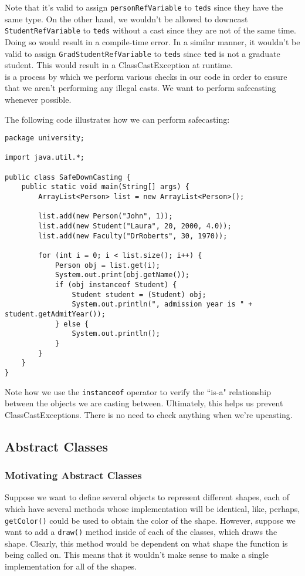 Note that it's valid to assign \verb!personRefVariable! to \verb!teds! since they have the same type. On the other hand, we wouldn't be allowed to downcast \verb!StudentRefVariable! to \verb!teds! without a cast since they are not of the same time. Doing so would result in a compile-time error. In a similar manner, it wouldn't be valid to assign \verb!GradStudentRefVariable! to \verb!teds! since \verb!ted! is not a graduate student. This would result in a ClassCastException at runtime. \\

 is a process by which we perform various checks in our code in order to ensure that we aren't performing any illegal casts. We want to perform safecasting whenever possible.

The following code illustrates how we can perform safecasting:

\begin{lstlisting}
package university;

import java.util.*;

public class SafeDownCasting {
	public static void main(String[] args) {
		ArrayList<Person> list = new ArrayList<Person>();

		list.add(new Person("John", 1));
		list.add(new Student("Laura", 20, 2000, 4.0));
		list.add(new Faculty("DrRoberts", 30, 1970));

		for (int i = 0; i < list.size(); i++) {
			Person obj = list.get(i);
			System.out.print(obj.getName());
			if (obj instanceof Student) {
				Student student = (Student) obj;
				System.out.println(", admission year is " + student.getAdmitYear());
			} else {
				System.out.println();
			}
		}
	}
}
\end{lstlisting}

Note how we use the \verb!instanceof! operator to verify the ``is-a" relationship between the objects we are casting between. Ultimately, this helps us prevent ClassCastExceptions. There is no need to check anything when we're upcasting. 


\subsection{Abstract Classes}

\subsubsection{Motivating Abstract Classes}
Suppose we want to define several objects to represent different shapes, each of which have several methods whose implementation will be identical, like, perhaps, \verb!getColor()! could be used to obtain the color of the shape. However, suppose we want to add a \verb!draw()! method inside of each of the classes, which draws the shape. Clearly, this method would be dependent on what shape the function is being called on. This means that it wouldn't make sense to make a single implementation for all of the shapes. 



